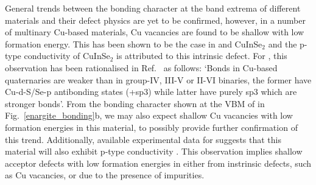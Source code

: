 \documentclass[11pt, twoside]{report}
\begin{document}
General trends between the bonding character at the band extrema of different materials and their defect physics are yet to be confirmed, however, in a number of multinary Cu-based materials, Cu vacancies are found to be shallow with low formation energy. This has been shown to be the case in {\CZTS} \cite{defects_Chen_large} and CuInSe$_2$ \cite{Zhang_CIS} and the p-type conductivity of CuInSe$_2$ is attributed to this intrinsic defect. For {\CZTS}, this observation has been rationalised in Ref.~ as follows: `Bonds in Cu-based quaternaries are weaker than in group-IV, III-V or II-VI binaries, the former have Cu-d-S/Se-p antibonding states (+sp3) while latter have purely sp3 which are stronger bonds'.
From the bonding character shown at the VBM of {\enargite} in Fig.~\ref{enargite_bonding}b, we may also expect shallow Cu vacancies with low formation energies in this material, to possibly provide further confirmation of this trend. Additionally, available experimental data for {\enargite} suggests that this material will also exhibit p-type conductivity \cite{enargite1995, sulfide_minerals_new}. This observation implies shallow acceptor defects with low formation energies in {\enargite} either from instrinsic defects, such as Cu vacancies, or due to the presence of impurities.

\end{document}
